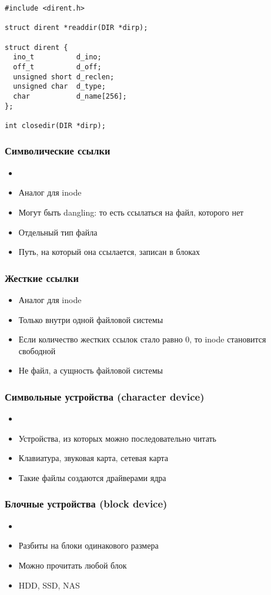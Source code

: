 \begin{lstlisting}[style=cpp]
#include <dirent.h>

struct dirent *readdir(DIR *dirp);

struct dirent {
  ino_t          d_ino;
  off_t          d_off;
  unsigned short d_reclen;
  unsigned char  d_type;
  char           d_name[256];
};

int closedir(DIR *dirp);
\end{lstlisting}
    
    \subsubsection{Символические ссылки}
      \begin{itemize}
        \item {}
        \item Аналог  для inode
        \item Могут быть dangling: то есть ссылаться на файл, которого нет
        \item Отдельный тип файла
        \item Путь, на который она ссылается, записан в блоках
      \end{itemize}
    
    \subsubsection{Жесткие ссылки}
      \begin{itemize}
        \item Аналог  для inode
        \item Только внутри одной файловой системы
        \item Если количество жестких ссылок стало равно 0, то inode становится свободной
        \item Не файл, а сущность файловой системы
      \end{itemize}
    
    \subsubsection{Символьные устройства (character device)}
      \begin{itemize}
        \item {}
        \item Устройства, из которых можно последовательно читать
        \item Клавиатура, звуковая карта, сетевая карта
        \item Такие файлы создаются драйверами ядра
      \end{itemize}
    
    \subsubsection{Блочные устройства (block device)}
      \begin{itemize}
        \item {}
        \item Разбиты на блоки одинакового размера
        \item Можно прочитать любой блок
        \item HDD, SSD, NAS
      \end{itemize}